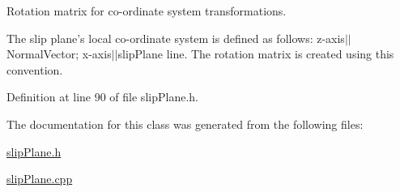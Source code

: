 Rotation matrix for co-\/ordinate system transformations. 

The slip plane's local co-\/ordinate system is defined as follows\-: z-\/axis$|$$|$\-Normal\-Vector; x-\/axis$|$$|$slip\-Plane line. The rotation matrix is created using this convention. 

Definition at line 90 of file slip\-Plane.\-h.



The documentation for this class was generated from the following files\-:\begin{DoxyCompactItemize}
\item 
\hyperlink{slipPlane_8h}{slip\-Plane.\-h}\item 
\hyperlink{slipPlane_8cpp}{slip\-Plane.\-cpp}\end{DoxyCompactItemize}
